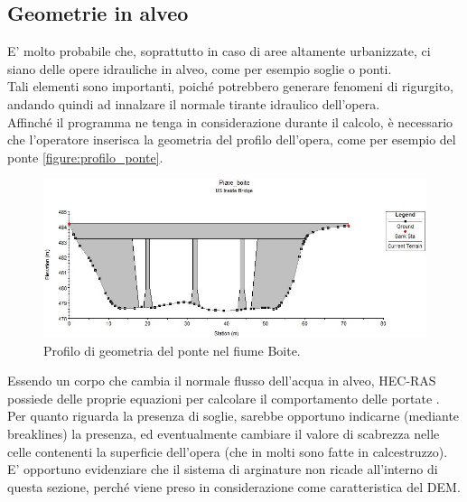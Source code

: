 \subsection{Geometrie in alveo}
E' molto probabile che, soprattutto in caso di aree altamente urbanizzate, ci siano delle opere idrauliche in alveo, come per esempio soglie o ponti.\\
Tali elementi sono importanti, poiché potrebbero generare fenomeni di rigurgito, andando quindi ad innalzare il normale tirante idraulico dell'opera.\\
Affinché il programma ne tenga in considerazione durante il calcolo, è necessario che l'operatore inserisca la geometria del profilo dell'opera, come per esempio del ponte \eqref{figure:profilo_ponte}. 
\begin{figure}[htb] \centering
    \includegraphics[scale=0.6]{immagini/profilo_ponte.JPG}
    \caption{Profilo di geometria del ponte nel fiume Boite.}
    \label{figure:profilo_ponte}
    \end{figure}
Essendo un corpo che cambia il normale flusso dell'acqua in alveo, HEC-RAS possiede delle proprie equazioni per calcolare il comportamento delle portate \cite{modeling_bridges}.\\
Per quanto riguarda la presenza di soglie, sarebbe opportuno indicarne (mediante breaklines) la presenza, ed eventualmente cambiare il valore di scabrezza nelle celle contenenti la superficie dell'opera (che in molti sono fatte in calcestruzzo).\\
E' opportuno evidenziare che il sistema di arginature non ricade all'interno di questa sezione, perché viene preso in considerazione come caratteristica del DEM.

